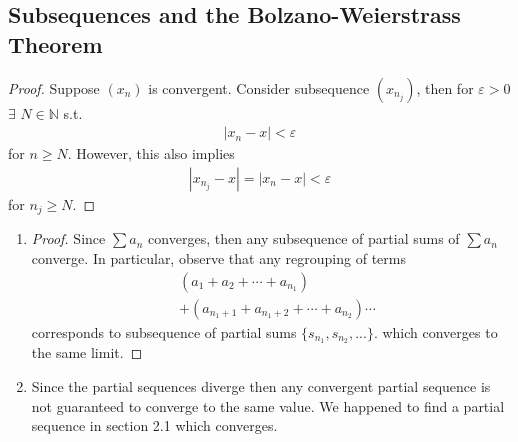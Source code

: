\subsection{Subsequences and the Bolzano-Weierstrass Theorem}

\begin{proof}
    Suppose $(x_n)$ is convergent. Consider subsequence $(x_{n_j})$,
    then for $\varepsilon > 0$ $\exists$ $N\in \mathbb{N} $ s.t. 
    \begin{align*}
        |x_n-x| < \varepsilon
    \end{align*}
    for $n \geq N$. However, this also implies
    \begin{align*}
        |x_{n_j} - x| = |x_{n} - x| < \varepsilon
    \end{align*}
    for $n_j \geq N$.
\end{proof}

\begin{enumerate}[label=(\alph*)]
    \item 
    \begin{proof}
        Since $\sum a_n$ converges, then any subsequence of partial sums of
        $\sum a_n$ converge. In particular, observe that any regrouping of 
        terms 
        \begin{align*}
            &(a_1+a_2+ \cdots + a_{n_1}) \\ &+ (a_{n_1+1}+a_{n_1+2}+ \cdots + a_{n_2}) \cdots
        \end{align*}
        corresponds to subsequence of partial sums $\{s_{n_1},s_{n_2},...\}$.
        which converges to the same limit.
    \end{proof}

    \item
    Since the partial sequences diverge then any convergent partial sequence
    is not guaranteed to converge to the same value. We happened to 
    find a partial sequence in section 2.1 which converges.
\end{enumerate}

